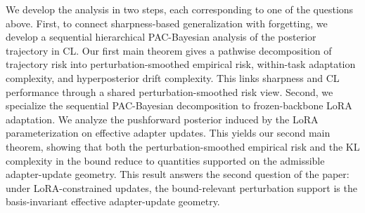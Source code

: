 \documentclass{article}
\begin{document}
We develop the analysis in two steps, each corresponding to one of the questions above. First, to connect sharpness-based generalization with forgetting, we develop a sequential hierarchical PAC-Bayesian analysis of the posterior trajectory in CL. 
Our first main theorem gives a pathwise decomposition of trajectory risk into perturbation-smoothed empirical risk, within-task adaptation complexity, and hyperposterior drift complexity. This links sharpness and CL performance through a shared perturbation-smoothed risk view.
Second, we specialize the sequential PAC-Bayesian decomposition to frozen-backbone LoRA adaptation. 
We analyze the pushforward posterior induced by the LoRA parameterization on effective adapter updates. 
This yields our second main theorem, showing that both the perturbation-smoothed empirical risk and the KL complexity in the bound reduce to quantities supported on the admissible adapter-update geometry. 
This result answers the second question of the paper: under LoRA-constrained updates, the bound-relevant perturbation support is the basis-invariant effective adapter-update geometry. 
\end{document}
